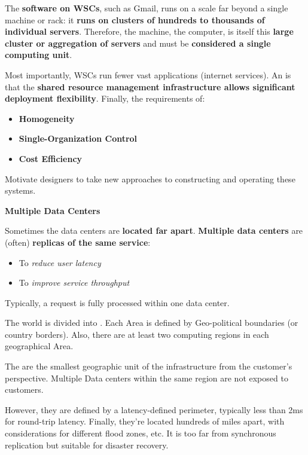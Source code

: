 \noindent
The \textbf{software on WSCs}, such as Gmail, runs on a scale far beyond a single machine or rack: it \textbf{runs on clusters of hundreds to thousands of individual servers}. Therefore, the machine, the computer, is itself this \textbf{large cluster or aggregation of servers} and must be \textbf{considered a single computing unit}.

\highspace
Most importantly, WSCs run fewer vast applications (internet services). An  is that the \textbf{shared resource management infrastructure allows significant deployment flexibility}. Finally, the requirements of:
\begin{itemize}
    \item \textbf{Homogeneity}
    \item \textbf{Single-Organization Control}
    \item \textbf{Cost Efficiency}
\end{itemize}
Motivate designers to take new approaches to constructing and operating these systems.

\newpage

\begin{center}
    \textcolor{Red2}{\textbf{Multiple Data Centers}}
\end{center}

\noindent
Sometimes the data centers are \textbf{located far apart}. \textbf{Multiple data centers} are (often) \textbf{replicas of the same service}:
\begin{itemize}
    \item To \emph{reduce user latency}
    \item To \emph{improve service throughput}
\end{itemize}
Typically, a request is fully processed within one data center.

\highspace
The world is divided into . Each Area is defined by Geo-political boundaries (or country borders). Also, there are at least two computing regions in each geographical Area.

\highspace
The  are the smallest geographic unit of the infrastructure from the customer's perspective. Multiple Data centers within the same region are not exposed to customers.

However, they are defined by a latency-defined perimeter, typically less than 2ms for round-trip latency.
Finally, they're located hundreds of miles apart, with considerations for different flood zones, etc. It is too far from synchronous replication but suitable for disaster recovery.

